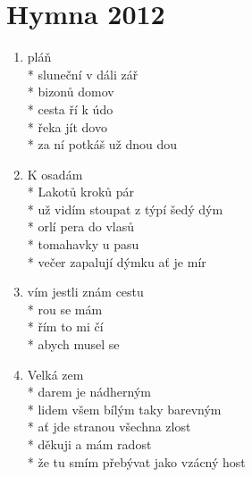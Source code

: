 \section{Hymna 2012}
\begin{enumerate}
\item {} pláň\\*
sluneční v dáli zář\\*
bizonů domov   \\*
cesta ří k údo\\*
řeka jít dovo\\*
za ní potkáš už dnou dou 
\item K osadám\\*
Lakotů kroků pár\\*
už vidím stoupat z týpí šedý dým\\*
orlí pera do vlasů\\*
tomahavky u pasu\\*
večer zapalují dýmku ať je mír
\item[] vím jestli znám cestu\\*
rou se mám \\*
řím to mi čí\\*
abych musel se 
\item Velká zem\\*
darem je nádherným\\*
lidem všem bílým taky barevným\\*
ať jde stranou všechna zlost\\*
děkuji a mám radost\\*
že tu smím přebývat jako vzácný host
\end{enumerate}
